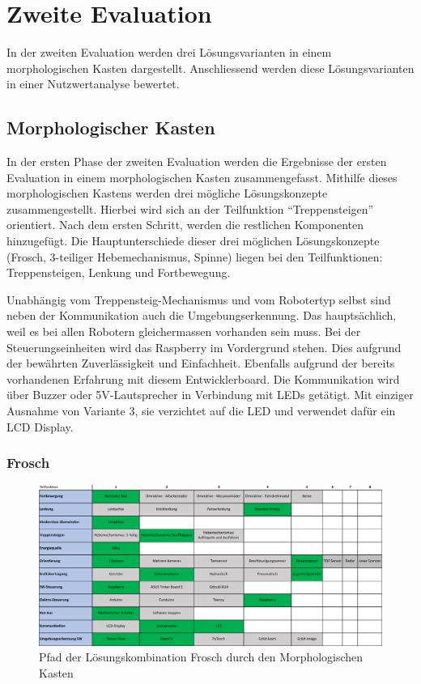 \newpage
\section*{Zweite Evaluation}
In der zweiten Evaluation werden drei Lösungsvarianten in einem morphologischen Kasten dargestellt. Anschliessend werden diese Lösungsvarianten in einer Nutzwertanalyse bewertet.
\subsection*{Morphologischer Kasten}
In der ersten Phase der zweiten Evaluation werden die Ergebnisse der ersten Evaluation in einem morphologischen Kasten zusammengefasst. Mithilfe dieses morphologischen Kastens werden drei mögliche Lösungskonzepte zusammengestellt. Hierbei wird sich an der Teilfunktion ``Treppensteigen'' orientiert. Nach dem ersten Schritt, werden die restlichen Komponenten hinzugefügt. Die Hauptunterschiede dieser drei möglichen Lösungskonzepte (Frosch, 3-teiliger Hebemechanismus, Spinne) liegen bei den Teilfunktionen: Treppensteigen, Lenkung und Fortbewegung.

Unabhängig vom Treppensteig-Mechanismus und vom Robotertyp selbst sind neben der Kommunikation auch die Umgebungserkennung. Das hauptsächlich, weil es bei allen Robotern gleichermassen vorhanden sein muss. Bei der Steuerungseinheiten wird das Raspberry im Vordergrund stehen. Dies aufgrund der bewährten Zuverlässigkeit und Einfachheit. Ebenfalls aufgrund der bereits vorhandenen Erfahrung mit diesem Entwicklerboard. Die Kommunikation wird über Buzzer oder 5V-Lautsprecher in Verbindung mit LEDs getätigt. Mit einziger Ausnahme von Variante 3, sie verzichtet auf die LED und verwendet dafür ein LCD Display.

\subsubsection*{Frosch}
\begin{figure}[h]
  \includegraphics[width=1.0\textwidth]{img/morphologische-kaesten/Morphologischer_Kasten_Frosch.png}
  \centering
  \caption{Pfad der Lösungskombination Frosch durch den Morphologischen Kasten}
  \label{fig:morphologischer-kasten-frosch}
\end{figure}
   
